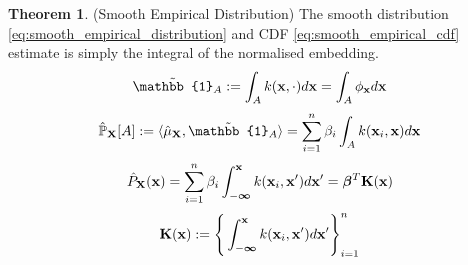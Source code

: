 \documentclass[twoside]{article} \usepackage{aistats2017}
\theoremstyle{definition}
\theoremstyle{theorem}
\newtheorem{theorem}{Theorem}[section]
\newcommand{\rv}[1]{{#1}}
\newcommand{\inner}[2]{{\langle #1, #2 \rangle}}
\begin{document}
		\begin{theorem} \label{thm:smooth_empirical_distribution_and_cdf}
			(Smooth Empirical Distribution)
			The smooth distribution \eqref{eq:smooth_empirical_distribution} and CDF \eqref{eq:smooth_empirical_cdf} estimate is simply the integral of the normalised embedding.
			\begin{equation}
				\tilde{\mathbb{1}}_{A} := \int_{A} k(\bvec{x}, \cdot) d\bvec{x} = \int_{A} \phi_{\bvec{x}} d\bvec{x}
			\label{eq:indicator_smooth}
			\end{equation}
			\begin{equation}
				\hat{\mathbb{P}}_{\bvec{\rv{X}}}[A] := \inner{\hat{\mu}_{\bvec{\rv{X}}}}{\tilde{\mathbb{1}}_{A}} = \sum_{i = 1}^{n} \beta_{i} \int_{A}  k(\bvec{x}_{i}, \bvec{x}) d\bvec{x}
			\label{eq:smooth_empirical_distribution}
			\end{equation}	
			\begin{equation}
				\hat{P}_{\bvec{\rv{X}}}(\bvec{x}) = \sum_{i = 1}^{n} \beta_{i} \int_{-\bm{\infty}}^{\bvec{x}}  k(\bvec{x}_{i}, \bvec{x}') d\bvec{x}' = \bm{\beta}^{T} \bvec{K}(\bvec{x})
			\label{eq:smooth_empirical_cdf}
			\end{equation}
			\begin{equation}
				\mathbf{K}(\mathbf{x}) := \Bigg\{ \int_{-\bm{\infty}}^{\mathbf{x}}  k(\mathbf{x}_{i}, \mathbf{x}') d\mathbf{x}' \Bigg\}_{i = 1}^{n}
			\label{eq:kernel_integral}
			\end{equation}
		\end{theorem}
			
\end{document}
